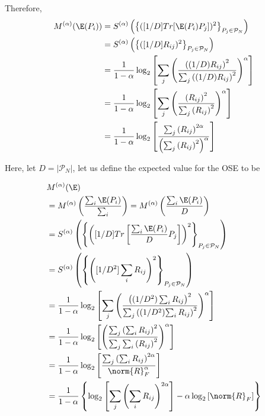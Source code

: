 Therefore,
\begin{equation}
\begin{split}
    M^{(\alpha)}(\E(P_i))&=S^{(\alpha)}\left(\left\{ ([1/D]Tr[\E(P_i)P_j])^2\right\}_{P_j\in\mathcal{P}_N}\right)\\
    &=S^{(\alpha)}\left(\left\{ ([1/D]R_{ij})^2\right\}_{P_j\in\mathcal{P}_N}\right)\\
    &=\frac{1}{1-\alpha}\log_2\left[\sum_j \left(\frac{\left((1/D){R_{ij}}\right)^2}{\sum_j\left((1/D){R_{ij}}\right)^2}\right)^\alpha\right]\\
    &=\frac{1}{1-\alpha}\log_2\left[\sum_j \left(\frac{\left({R_{ij}}\right)^2}{\sum_j\left({R_{ij}}\right)^2}\right)^\alpha\right]\\
    &=\frac{1}{1-\alpha}\log_2\left[ \frac{\sum_j\left({R_{ij}}\right)^{2\alpha}}{\left(\sum_j\left({R_{ij}}\right)^2\right)^\alpha}\right]
\end{split}
\end{equation}

Here, let $D=|\mathcal{P}_N|$, let us define the expected value for the OSE to be

\begin{equation}
\begin{split}
    &M^{(\alpha)}(\E)\\
    &=M^{(\alpha)}\left(\frac{\sum_i\E(P_i)}{\sum_i}\right) = M^{(\alpha)}\left(\frac{\sum_i\E(P_i)}{D}\right)\\
    &=S^{(\alpha)}\left(\left\{ \left([1/D]Tr\left[\frac{\sum_i\E(P_i)}{D}P_j\right]\right)^2\right\}_{P_j\in\mathcal{P}_N}\right)\\
    &=S^{(\alpha)}\left(\left\{ \left([1/D^2]\sum_iR_{ij}\right)^2\right\}_{P_j\in\mathcal{P}_N}\right)\\
    &=\frac{1}{1-\alpha}\log_2\left[\sum_j \left(\frac{\left((1/D^2)\sum_i{R_{ij}}\right)^2}{\sum_j\left((1/D^2){\sum_iR_{ij}}\right)^2}\right)^\alpha\right]\\
    &=\frac{1}{1-\alpha}\log_2\left[ \left(\frac{\sum_j\left(\sum_i{R_{ij}}\right)^2}{\sum_j\sum_i\left({R_{ij}}\right)^2}\right)^\alpha\right]\\
    &=\frac{1}{1-\alpha}\log_2\left[ \frac{\sum_j\left(\sum_i{R_{ij}}\right)^{2\alpha}}{\norm{R}_F^\alpha}\right]\\
    &=\frac{1}{1-\alpha}\left\{ \log_2\left[ \sum_j\left(\sum_i{R_{ij}}\right)^{2\alpha}\right] -\alpha\log_2\left[ \norm{R}_F\right]\right\}
\end{split}
\label{eq:OSE_bound_channel_frobenius}
\end{equation}

